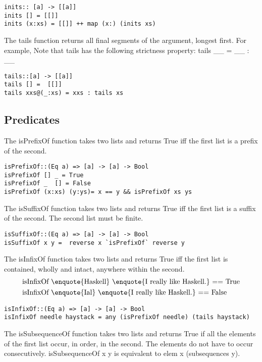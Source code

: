 \begin{lstlisting}[frame=single]
inits:: [a] -> [[a]]
inits [] = [[]]
inits (x:xs) = [[]] ++ map (x:) (inits xs)
\end{lstlisting}

The tails function returns all final segments of the argument, longest first. For example,
Note that tails has the following strictness property: tails \_\textbar\_ = \_\textbar\_ : \_\textbar\_
\begin{lstlisting}[frame=single]
tails::[a] -> [[a]]
tails [] =  [[]]
tails xxs@(_:xs) = xxs : tails xs
\end{lstlisting}

\subsection{Predicates}
The isPrefixOf function takes two lists and returns True iff the first list is a prefix of the second.
\begin{lstlisting}[frame=single]
isPrefixOf::(Eq a) => [a] -> [a] -> Bool
isPrefixOf [] _ = True
isPrefixOf _  [] = False
isPrefixOf (x:xs) (y:ys)= x == y && isPrefixOf xs ys
\end{lstlisting}

The isSuffixOf function takes two lists and returns True iff the first list is a suffix of the second. The second list must be finite.
\begin{lstlisting}[frame=single]
isSuffixOf::(Eq a) => [a] -> [a] -> Bool
isSuffixOf x y =  reverse x `isPrefixOf` reverse y
\end{lstlisting}

The isInfixOf function takes two lists and returns True iff the first list is contained, wholly and intact, anywhere within the second.
\begin{align*}
	&\text{isInfixOf \enquote{Haskell} \enquote{I really like Haskell.} == True}\\
	&\text{isInfixOf \enquote{Ial} \enquote{I really like Haskell.} == False}
\end{align*}
\begin{lstlisting}[frame=single]
isInfixOf::(Eq a) => [a] -> [a] -> Bool
isInfixOf needle haystack = any (isPrefixOf needle) (tails haystack)
\end{lstlisting}

The isSubsequenceOf function takes two lists and returns True if all the elements of the first list occur, in order, in the second. The elements do not have to occur consecutively.
isSubsequenceOf x y is equivalent to elem x (subsequences y).
\skipped
